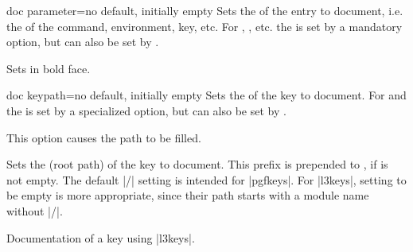 \begin{docTcbKey}[][doc new={2020-04-22}]{doc parameter}{=}{no default, initially empty}
  Sets the  of the entry to document, i.e. the  of the
  command, environment, key, etc. For , , etc.
  the  is set by a mandatory option, but can also be set
  by .
\begin{dispExample}
\begin{docCommands}[
    doc no index,  %
    doc name      = textbf,
    doc parameter = \marg{text},
  ] {}
  Sets  in bold face.
\end{docCommands}
\end{dispExample}
\end{docTcbKey}



\begin{docTcbKey}[][doc new={2020-04-22}]{doc keypath}{=}{no default, initially empty}
  Sets the  of the key to document. For 
  and  the   is set by a specialized option,
  but can also be set by .
\begin{dispExample}
\begin{docKeys}[
    doc no index,  %
    doc keypath     = tikz,
    doc name        = fill,
    doc parameter   = \colOpt{=\meta{color}},
    doc description = default is scope's color setting,
  ] {}
  This option causes the path to be filled.
\end{docKeys}
\end{dispExample}
\end{docTcbKey}

\clearpage

\begin{docTcbKeys}[
    doc new         = {2023-12-01},
    doc name        = doc key prefix,
    doc parameter   = {=\meta{key prefix}},
    doc description = {no default, initially |/|},
  ]{}
  Sets the  (root path) of the key to document.
  This prefix is prepended to , if
   is not empty.
  The default |/| setting is intended for |pgfkeys|.
  For |l3keys|, setting  to be empty is more
  appropriate, since their path starts with a module name without |/|.
\begin{dispExample}
\begin{docKeys}[
    doc no index,  %
    doc key prefix  = ,
    doc keypath     = tcobox,%
    doc name        = my_l3_key,
    doc parameter   = {=\meta{some value}},
    doc description = example,
  ] {}
  Documentation of a key using |l3keys|.
\end{docKeys}
\end{dispExample}
\end{docTcbKeys}



